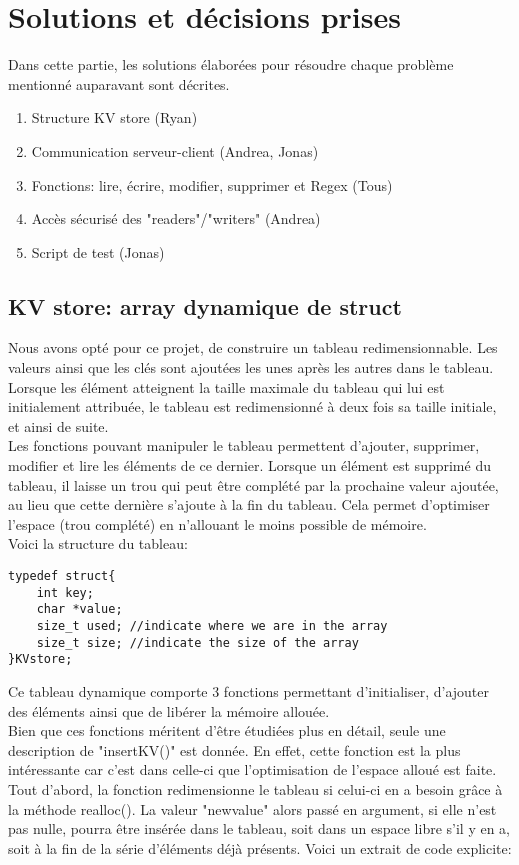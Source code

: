 \documentclass[11pt,a4paper]{article}
\begin{document}
\section{Solutions et décisions prises}
Dans cette partie, les solutions élaborées pour résoudre chaque problème mentionné auparavant sont décrites.

\begin{enumerate}
\item Structure KV store (Ryan)
\item Communication serveur-client (Andrea, Jonas)
\item Fonctions: lire, écrire, modifier, supprimer  et Regex (Tous)
\item Accès sécurisé des "readers"/"writers" (Andrea)
\item Script de test (Jonas)
\end{enumerate}

\subsection{KV store: array dynamique de struct}
Nous avons opté pour ce projet, de construire un tableau redimensionnable. Les valeurs ainsi que les clés sont ajoutées les unes après les autres dans le tableau. Lorsque les élément atteignent la taille maximale du tableau qui lui est initialement attribuée, le tableau est redimensionné à deux fois sa taille initiale, et ainsi de suite.\\
Les fonctions pouvant manipuler le tableau permettent d'ajouter, supprimer, modifier et  lire les éléments de ce dernier. Lorsque un élément est supprimé du tableau, il laisse un trou qui peut être complété par la prochaine valeur ajoutée, au lieu que cette dernière s'ajoute à la fin du tableau. Cela permet d'optimiser l'espace (trou complété) en n'allouant le moins possible de mémoire.\\
Voici la structure du tableau:

\begin{lstlisting}
typedef struct{
    int key; 
    char *value;
    size_t used; //indicate where we are in the array
    size_t size; //indicate the size of the array
}KVstore;
\end{lstlisting}

Ce tableau dynamique comporte 3 fonctions permettant d'initialiser, d'ajouter des éléments ainsi que de libérer la mémoire allouée. \\
Bien que ces fonctions méritent d'être étudiées plus en détail, seule une description de "insertKV()" est donnée. En effet, cette fonction est la plus intéressante car c'est dans celle-ci que l'optimisation de l'espace alloué est faite.\\
Tout d'abord, la fonction redimensionne le tableau si celui-ci en a besoin  grâce à la méthode realloc(). La valeur "newvalue" alors passé en argument, si elle n'est pas nulle,  pourra être insérée dans le tableau, soit dans un espace libre s'il y en a, soit à la fin de la série d'éléments déjà présents. Voici un extrait de code explicite:
\end{document}
